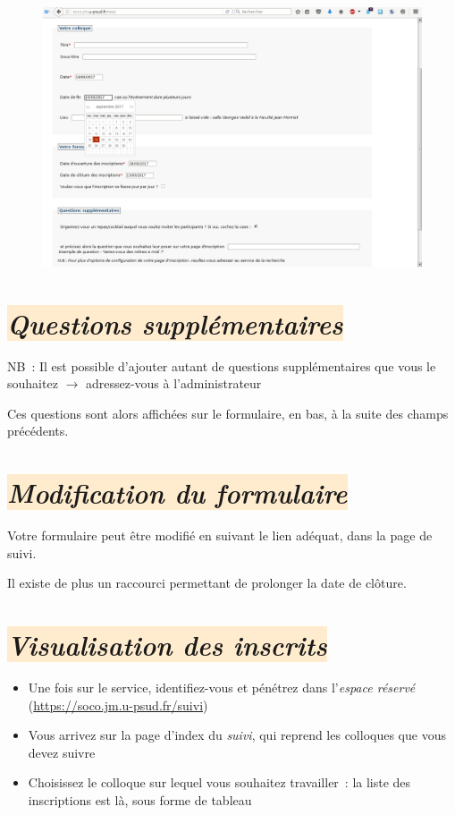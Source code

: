 \documentclass[10pt,a4paper]{article}
\newcommand{\rosepale}[1]{\colorbox{BlanchedAlmond}{#1}}
\begin{document}
\begin{figure}[h]
  \includegraphics[width=500px]{images/creation-formulaire}
\end{figure}

\section*{\rosepale{\emph{Questions supplémentaires}}}

NB : Il est possible d'ajouter autant de questions supplémentaires que vous le souhaitez $\longrightarrow$ adressez-vous à l'administrateur

Ces questions sont alors affichées sur le formulaire, en bas, à la suite des champs précédents.

\section*{\rosepale{\emph{Modification du formulaire}}}

Votre formulaire peut être modifié en suivant le lien adéquat, dans la page de suivi.

Il existe de plus un raccourci permettant de prolonger la date de clôture.


\section*{\rosepale{\emph{Visualisation des inscrits}}}

\begin{itemize}
  \item Une fois sur le service, identifiez-vous et pénétrez dans l'\emph{espace réservé} (\url{https://soco.jm.u-psud.fr/suivi})
  \item Vous arrivez sur la page d'index du \emph{suivi}, qui reprend les colloques que vous devez suivre
  \item Choisissez le colloque sur lequel vous souhaitez travailler : la liste des inscriptions est là, sous forme de tableau
\end{itemize}
\end{document}
